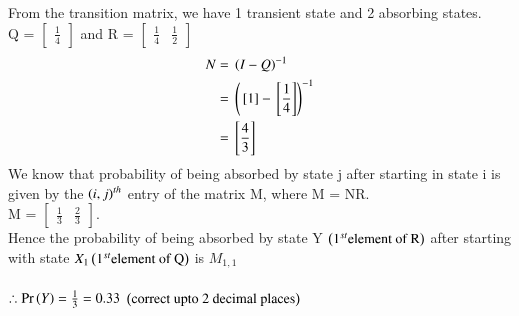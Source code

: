 \documentclass[journal,12pt,twocolumn]{IEEEtran}
\begin{document}
From the transition matrix, we have 1 transient state and 2 absorbing states.\\ Q = $\begin{bmatrix} \frac{1}{4} \end{bmatrix}$ and R = $\begin{bmatrix} \frac{1}{4} & \frac{1}{2} \end{bmatrix}$
\begin{align}
 N ={}& \left(I - Q\right)^{-1}\\
 ={}& \left({}\left[1\right] - {}\left[\frac{1}{4}\right]\right)^{-1}\\
 ={}& {}\left[\frac{4}{3}\right]
\end{align}
We know that probability of being absorbed by state j after starting in state i is given by the $\left(i,j\right)^{th}$ entry of the matrix M, where M = NR.\\
M = $\begin{bmatrix} \frac{1}{3} & \frac{2}{3} \end{bmatrix}$.\\
 Hence the probability of being absorbed by state Y $\left(1^{st} \text{element of R}\right)$ after starting with state $X_{1}\left(1^{st}\text{element of Q}\right)$ is $M_{1,1}$\\
 \\
$\therefore \Pr\left(Y\right)=\frac{1}{3}=0.33$ $\left(\text{correct upto 2 decimal places}\right)$
\end{document}
